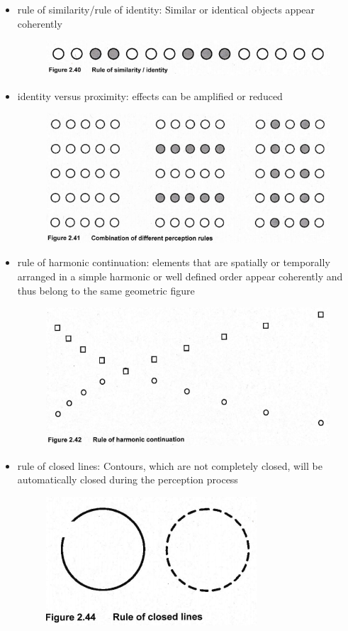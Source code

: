 \documentclass{standalone}
\begin{document}
\begin{itemize}
\begin{itemize}
		\item rule of similarity/rule of identity: Similar or identical objects appear coherently 
		\begin{figure}[H]
			\centering
			\includegraphics[width = 0.5\linewidth]{Figures/2_40.png}
		\end{figure}
		\item identity versus proximity: effects can be amplified or reduced
		\begin{figure}[H]
			\centering
			\includegraphics[width = 0.5\linewidth]{Figures/2_41.png}
		\end{figure}
		\item rule of harmonic continuation: elements that are spatially or temporally arranged in a simple harmonic or well defined order appear coherently and thus belong to the same geometric figure
		\begin{figure}[H]
			\centering
			\includegraphics[width = 0.5\linewidth]{Figures/2_42.png}
		\end{figure}
		\item rule of closed lines: Contours, which are not completely closed, will be automatically closed during the perception process
			\begin{figure}[H]
				\centering
				\includegraphics[width = 0.5\linewidth]{Figures/2_44.png}

\end{figure}
\end{itemize}
\end{itemize}
\end{document}
